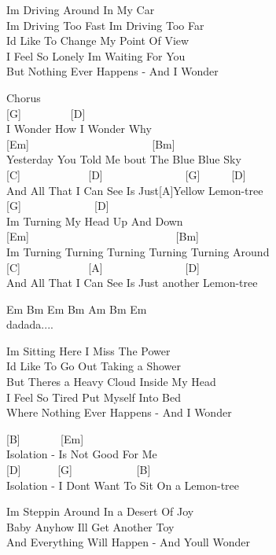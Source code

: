 \documentclass[
  letterpaper,
]{scrbook}
\begin{document}
I\textquotesingle m Driving Around In My Car\\
I\textquotesingle m Driving Too Fast I\textquotesingle m Driving Too
Far\\
I\textquotesingle d Like To Change My Point Of View\\
I Feel So Lonely I\textquotesingle m Waiting For You\\
But Nothing Ever Happens - And I Wonder

Chorus\\
{[}G{]} ~ ~ ~ ~ ~ {[}D{]}\\
I Wonder How I Wonder Why\\
{[}Em{]} ~ ~ ~ ~ ~ ~ ~ ~ ~ ~ ~ ~ ~ {[}Bm{]}\\
Yesterday You Told Me \textquotesingle bout The Blue Blue Sky\\
{[}C{]} ~ ~ ~ ~ ~ ~ ~ {[}D{]} ~ ~ ~ ~ ~ ~ ~ ~ ~{[}G{]} ~ ~ ~ {[}D{]}\\
And All That I Can See Is Just{[}A{]}Yellow Lemon-tree\\
{[}G{]} ~ ~ ~ ~ ~ ~ ~ ~{[}D{]}\\
I\textquotesingle m Turning My Head Up And Down\\
{[}Em{]} ~ ~ ~ ~ ~ ~ ~ ~ ~ ~ ~ ~ ~ ~ ~ ~{[}Bm{]}\\
I\textquotesingle m Turning Turning Turning Turning Turning Around\\
{[}C{]} ~ ~ ~ ~ ~ ~ ~ {[}A{]} ~ ~ ~ ~ ~ ~ ~ ~ ~{[}D{]}\\
And All That I Can See Is Just another Lemon-tree

Em Bm Em Bm Am Bm Em\\
dadada....

I\textquotesingle m Sitting Here I Miss The Power\\
I\textquotesingle d Like To Go Out Taking a Shower\\
But There\textquotesingle s a Heavy Cloud Inside My Head\\
I Feel So Tired Put Myself Into Bed\\
Where Nothing Ever Happens - And I Wonder

{[}B{]} ~ ~ ~ ~ {[}Em{]}\\
Isolation - Is Not Good For Me\\
{[}D{]} ~ ~ ~ ~{[}G{]} ~ ~ ~ ~ ~ ~ ~{[}B{]}\\
Isolation - I Don\textquotesingle t Want To Sit On a Lemon-tree

I\textquotesingle m Steppin\textquotesingle{} Around In a Desert Of
Joy\\
Baby Anyhow I\textquotesingle ll Get Another Toy\\
And Everything Will Happen - And You\textquotesingle ll Wonder
\end{document}
